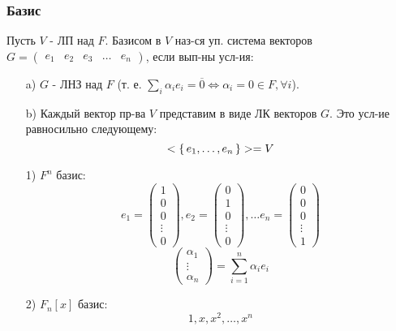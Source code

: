 \subsubsection{Базис}
\begin{definition}
  Пусть $V$ - ЛП над $F$. Базисом в $V$ наз-ся уп. система векторов $G = \begin{pmatrix}e_1 & e_2 & e_3 & \ldots & e_n \end{pmatrix}$, если вып-ны усл-ия:
  \begin{itemize}
    \item [a) ] $G$ - ЛНЗ над $F$ (т. е. $\sum_{i}^{}\alpha_i e_i = \overline{0} \iff \alpha_i = 0 \in F, \forall i$).
    \item [b) ] Каждый вектор пр-ва $V$ представим в виде ЛК векторов $G$. Это усл-ие равносильно следующему:
      \[
      <\set{e_1, \ldots, e_n}> = V
      \]
  \end{itemize}
\end{definition}
\begin{example}
\begin{itemize}
  \item [1) ] $F^{n}$ базис:
    \[
      e_1 = \begin{pmatrix}1 \\ 0 \\ 0 \\ \vdots \\ 0 \end{pmatrix}, e_2 = \begin{pmatrix} 0 \\ 1 \\ 0 \\ \vdots \\ 0 \end{pmatrix}, \ldots e_n = \begin{pmatrix} 0 \\ 0 \\ 0 \\ \vdots \\ 1 \end{pmatrix}
    \]
    \[
    \begin{pmatrix}\alpha_1 \\ \vdots \\ \alpha_n \end{pmatrix} = \sum_{i = 1}^{n} \alpha_i e_i
    \]
  \item [2) ] $F_n[x]$ базис:
    \[
    1, x, x^{2}, \ldots, x^{n}
    \]
\end{itemize}
\end{example}
